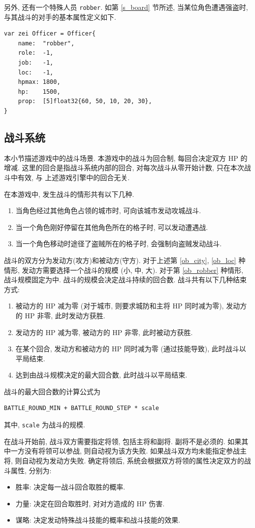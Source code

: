 \documentclass[UTF8, zihao=-4]{ctexart} %
\newcommand{\lcode}{\lstinline} % 段内插入代码
\begin{document}
另外, 还有一个特殊人员 \lcode{robber}. 如第 \ref{s_board} 节所述,
当某位角色遭遇强盗时, 与其战斗的对手的基本属性定义如下.
\begin{lstlisting}
var zei Officer = Officer{
	name:  "robber",
	role:  -1,
	job:   -1,
	loc:   -1,
	hpmax: 1800,
	hp:    1500,
	prop:  [5]float32{60, 50, 10, 20, 30},
}
\end{lstlisting}

\subsection{战斗系统}
\label{s_battle}
本小节描述游戏中的战斗场景. 本游戏中的战斗为回合制, 每回合决定双方 HP 的增减.
这里的回合是指战斗系统内部的回合, 对每次战斗从零开始计数, 只在本次战斗中有效, 与
上述游戏引擎中的回合无关. 

在本游戏中, 发生战斗的情形共有以下几种.
\begin{enumerate}
      \item \label{ob_city}当角色经过其他角色占领的城市时, 可向该城市发动攻城战斗.
      \item \label{ob_loc}当一个角色刚好停留在其他角色所在的格子时, 可以发动遭遇战.
      \item \label{ob_robber}当一个角色移动时途径了盗贼所在的格子时, 会强制向盗贼发动战斗.
\end{enumerate}
战斗的双方分为发动方(攻方)和被动方(守方). 对于上述第 \ref{ob_city}, \ref{ob_loc} 种情形, 
发动方需要选择一个战斗的规模 (小, 中, 大). 对于第 \ref{ob_robber} 种情形,
战斗规模固定为中. 战斗的规模会决定战斗持续的回合数. 战斗共有以下几种结束方式:
\begin{enumerate}
      \item 被动方的 HP 减为零 (对于城市, 则要求城防和主将 HP 同时减为零), 发动方的 HP 非零, 此时发动方获胜.
      \item 发动方的 HP 减为零, 被动方的 HP 非零, 此时被动方获胜.
      \item 在某个回合, 发动方和被动方的 HP 同时减为零 (通过技能导致), 此时战斗以平局结束.
      \item 达到由战斗规模决定的最大回合数, 此时战斗以平局结束.
\end{enumerate}
战斗的最大回合数的计算公式为
\begin{lstlisting}
BATTLE_ROUND_MIN + BATTLE_ROUND_STEP * scale
\end{lstlisting}
其中, \lcode{scale} 为战斗的规模.

在战斗开始前, 战斗双方需要指定将领, 包括主将和副将. 副将不是必须的.
如果其中一方没有将领可以参战, 则自动视为该方失败.
如果战斗双方均未能指定参战主将, 则自动视为发动方失败.
确定将领后, 系统会根据双方将领的属性决定双方的战斗属性, 分别为:
\begin{itemize}
      \item 胜率: 决定每一战斗回合取胜的概率.
      \item 力量: 决定在回合取胜时, 对对方造成的 HP 伤害.
      \item 谋略: 决定发动特殊战斗技能的概率和战斗技能的效果.
\end{itemize}
\end{document}
